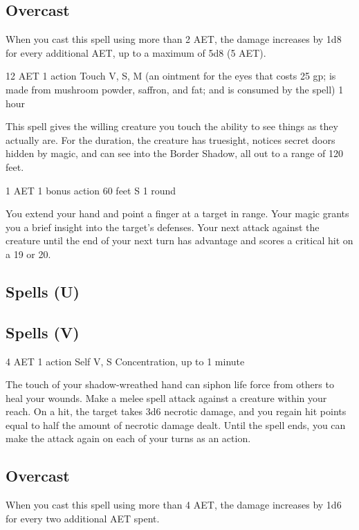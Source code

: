 \subsection*{Overcast} When you cast this spell using more than 2 AET, the damage increases by 1d8 for every additional AET, up to a maximum of 5d8 (5 AET).

\label{spell:true-seeing}
{12 AET}
{1 action}
{Touch}
{V, S, M (an ointment for the eyes that costs 25 gp; is made from mushroom powder, saffron, and fat; and is consumed by the spell)}
{1 hour}

This spell gives the willing creature you touch the ability to see things as they actually are. For the duration, the creature has truesight, notices secret doors hidden by magic, and can see into the Border Shadow, all out to a range of 120 feet.

\label{spell:true-strike}
{1 AET}
{1 bonus action}
{60 feet}
{S}
{1 round}

You extend your hand and point a finger at a target in range. Your magic grants you a brief insight into the target's defenses. Your next attack against the creature until the end of your next turn has advantage and scores a critical hit on a 19 or 20. 

\subsection{Spells (U)}

\subsection{Spells (V)}

\label{spell:vampiric-touch}
{4 AET}
{1 action}
{Self}
{V, S}
{Concentration, up to 1 minute}

The touch of your shadow-wreathed hand can siphon life force from others to heal your wounds. Make a melee spell attack against a creature within your reach. On a hit, the target takes 3d6 necrotic damage, and you regain hit points equal to half the amount of necrotic damage dealt. Until the spell ends, you can make the attack again on each of your turns as an action.

\subsection*{Overcast} When you cast this spell using more than 4 AET, the damage increases by 1d6 for every two additional AET spent.


